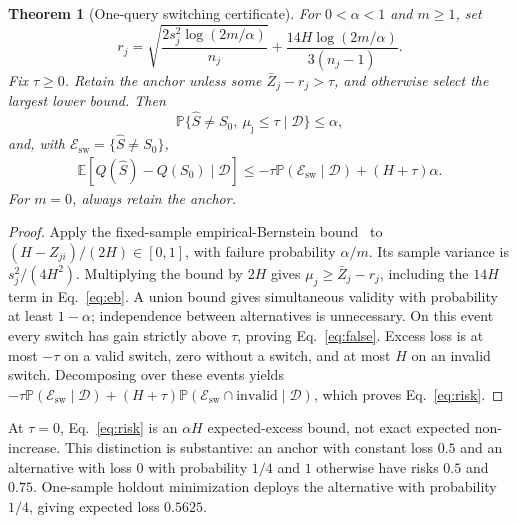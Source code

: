 \documentclass[preprint,11pt,sort&compress]{elsarticle}
\newtheorem{theorem}{Theorem}
\newcommand{\E}{\mathbb E}
\newcommand{\Prob}{\mathbb{P}}
\begin{document}
\begin{theorem}[One-query switching certificate]
\label{thm:certificate}
For $0<\alpha<1$ and $m\ge1$, set
\begin{equation}
 r_j=\sqrt{\frac{2s_j^2\log(2m/\alpha)}{n_j}}
       +\frac{14H\log(2m/\alpha)}{3(n_j-1)}.\label{eq:eb}
\end{equation}
Fix $\tau\ge0$. Retain the anchor unless some $\bar Z_j-r_j>\tau$, and otherwise select the largest lower bound. Then
\begin{equation}
 \Prob\{\widehat S\ne S_0,\ \mu_{\widehat\jmath}\le\tau
                 \mid\mathcal D\}\le\alpha,\label{eq:false}
\end{equation}
and, with $\mathcal E_{\mathrm{sw}}=\{\widehat S\ne S_0\}$,
\begin{align}
 \E[Q(\widehat S)-Q(S_0)\mid\mathcal D]
 \le-\tau\Prob(\mathcal E_{\mathrm{sw}}\mid\mathcal D)+(H+\tau)\alpha.
 \label{eq:risk}
\end{align}
For $m=0$, always retain the anchor.
\end{theorem}
\begin{proof}
Apply the fixed-sample empirical-Bernstein bound~\cite{maurer2009} to $(H-Z_{ji})/(2H)\in[0,1]$, with failure probability $\alpha/m$. Its sample variance is $s_j^2/(4H^2)$. Multiplying the bound by $2H$ gives
$\mu_j\ge\bar Z_j-r_j$, including the $14H$ term in Eq.~\ref{eq:eb}. A union bound gives simultaneous validity with probability at least $1-\alpha$; independence between alternatives is unnecessary. On this event every switch has gain strictly above $\tau$, proving Eq.~\ref{eq:false}. Excess loss is at most $-\tau$ on a valid switch, zero without a switch, and at most $H$ on an invalid switch. Decomposing over these events yields
$-\tau\Prob(\mathcal E_{\mathrm{sw}}\mid\mathcal D)+(H+\tau)\Prob(\mathcal E_{\mathrm{sw}}\cap\text{invalid}\mid\mathcal D)$,
which proves Eq.~\ref{eq:risk}.
\end{proof}

At $\tau=0$, Eq.~\ref{eq:risk} is an $\alpha H$ expected-excess bound, not exact expected non-increase. This distinction is substantive: an anchor with constant loss $0.5$ and an alternative with loss $0$ with probability $1/4$ and $1$ otherwise have risks $0.5$ and $0.75$. One-sample holdout minimization deploys the alternative with probability $1/4$, giving expected loss $0.5625$.
\end{document}
